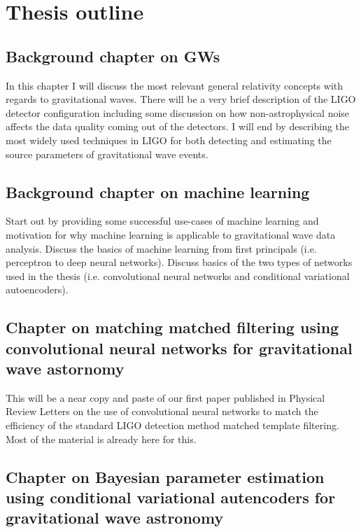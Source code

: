 %
%

\chapter{Thesis outline}

\section{Background chapter on GWs}

In this chapter I will discuss the most relevant general relativity concepts with regards to gravitational waves. There will be a very brief description of the LIGO detector configuration including some discussion on how non-astrophysical noise affects the data quality coming out of the detectors. I will end by describing the most widely used techniques in LIGO for both detecting and estimating the source parameters of gravitational wave events.

\section{Background chapter on machine learning}

Start out by providing some successful use-cases of machine learning and motivation for why machine learning is applicable to gravitational wave data analysis. Discuss the basics of machine learning from first principals (i.e. perceptron to deep neural networks). Discuss basics of the two types of networks used in the thesis (i.e. convolutional neural networks and conditional variational autoencoders).

\section{Chapter on matching matched filtering using convolutional neural networks for gravitational wave astornomy}

This will be a near copy and paste of our first paper published in Physical Review Letters on the use of convolutional neural networks to match the efficiency of the standard LIGO detection method matched template filtering. Most of the material is already here for this.

\section{Chapter on Bayesian parameter estimation using conditional variational autencoders for gravitational wave astronomy}

